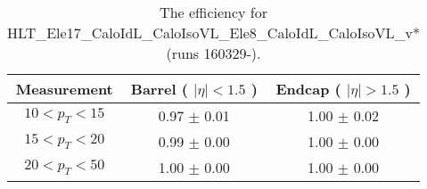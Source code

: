 \begin{table}[!ht]
\begin{center}
\begin{tabular}{c|c|c}
\hline
Measurement & Barrel ( $|\eta|<1.5$ )   & Endcap ( $|\eta|>1.5$ )  \\ 
\hline
$  10<p_T<  15$ & 0.97 $\pm$ 0.01  & 1.00 $\pm$ 0.02  \\ \hline 
$  15<p_T<  20$ & 0.99 $\pm$ 0.00  & 1.00 $\pm$ 0.00  \\ \hline 
$  20<p_T<  50$ & 1.00 $\pm$ 0.00  & 1.00 $\pm$ 0.00  \\ \hline 
\end{tabular}
\caption{The efficiency for HLT\_Ele17\_CaloIdL\_CaloIsoVL\_Ele8\_CaloIdL\_CaloIsoVL\_v* (runs 160329-).}
\label{tab:eff_ele_17_8_B}
\end{center}
\end{table}

